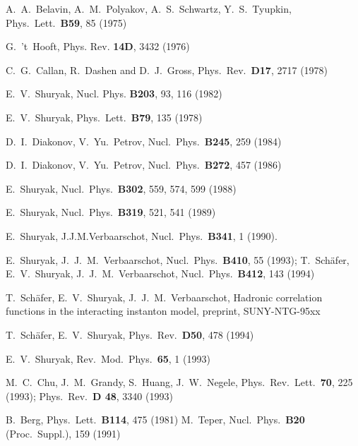 \begin{thebibliography}{xx}

A.~A.~Belavin, A.~M.~Polyakov, A.~S.~Schwartz, Y.~S.~Tyupkin,
Phys.~Lett.~{\bf B59}, 85 (1975)

G.~'t~Hooft,
Phys. Rev. {\bf 14D}, 3432 (1976)

C.~G.~Callan, R.~Dashen and D.~J.~Gross,
Phys.~Rev.~{\bf D17}, 2717 (1978)

E.~V.~Shuryak,
Nucl. Phys. {\bf B203}, 93, 116 (1982)

E.~V.~Shuryak,
Phys.~Lett.~{\bf B79}, 135 (1978)

D.~I.~Diakonov, V.~Yu.~Petrov,
Nucl.~Phys.~{\bf B245}, 259 (1984)

D.~I.~Diakonov, V.~Yu.~Petrov,
Nucl.~Phys.~{\bf B272}, 457 (1986)

E.~Shuryak,
Nucl.~Phys.~{\bf B302}, 559, 574, 599 (1988)

E.~Shuryak,
Nucl.~Phys.~{\bf B319}, 521, 541 (1989)

E.~Shuryak, J.J.M.Verbaarschot,
Nucl.~Phys.~{\bf B341}, 1 (1990).

E.~Shuryak, J.~J.~M.~Verbaarschot,
Nucl.~Phys.~{\bf B410}, 55 (1993);
T.~Sch\"afer, E.~V.~Shuryak, J.~J.~M.~Verbaarschot,
Nucl.~Phys.~{\bf B412}, 143 (1994)

T.~Sch\"afer, E.~V.~Shuryak, J.~J.~M.~Verbaarschot,
Hadronic correlation functions in the interacting instanton model,
preprint, SUNY-NTG-95xx

T.~Sch\"afer, E.~V.~Shuryak,
Phys.~Rev.~{\bf D50}, 478 (1994)

E.~V.~Shuryak,
Rev.~Mod.~Phys.~{\bf 65}, 1 (1993)

M.~C.~Chu, J.~M.~Grandy, S.~Huang, J.~W.~Negele,
Phys.~Rev.~Lett.~{\bf 70}, 225 (1993);
Phys.~Rev.~{\bf D 48}, 3340 (1993)

B.~Berg,
Phys.~Lett.~{\bf B114}, 475 (1981)
M.~Teper,
Nucl.~Phys.~{\bf B20} (Proc.~Suppl.), 159 (1991)


\end{thebibliography}
